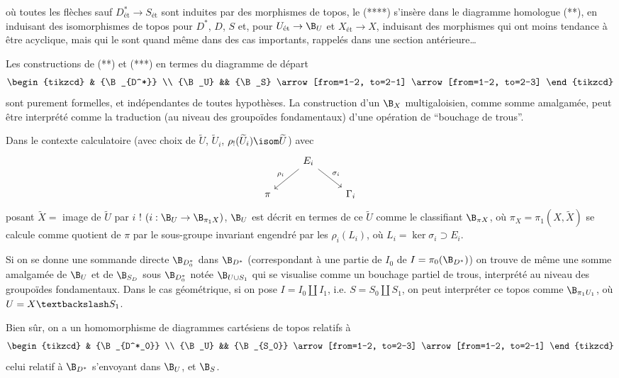 où toutes les flèches sauf $D^*_{\text{ét}} \to S_{\text{ét}}$ sont induites par des morphismes de topos, le (****) s'insère dans le diagramme homologue (**), en induisant des isomorphismes de topos pour $D^*$, $D$, $S$ et, pour $U_{\text{ét}} \to \B_U$ et $X_{\text{ét}} \to X$, induisant des morphismes qui ont moins tendance à être acyclique, mais qui le sont quand même dans des cas importants, rappelés dans une section antérieure\dots

Les constructions de (**) et (***) en termes du diagramme de départ
\[\begin{tikzcd}
	& {\B_{D^*}} \\
	{\B_U} && {\B_S}
	\arrow[from=1-2, to=2-1]
	\arrow[from=1-2, to=2-3]
\end{tikzcd}\]
sont purement formelles, et indépendantes de toutes hypothèses. La construction d'un $\B_X$ multigaloisien, comme somme amalgamée, peut être interprété comme la traduction (au niveau des groupoïdes fondamentaux) d'une opération de ``bouchage de trous''.

Dans le contexte calculatoire (avec choix de $\widetilde{U}$, $\widetilde{U}_i$, $\rho_! (\widetilde{U}_i) \isom \widetilde{U}$) avec
\[\begin{tikzcd}
	& {E_i} \\
	\pi && {\Gamma_i}
	\arrow["{\rho_i}"', from=1-2, to=2-1]
	\arrow["{\sigma_i}", from=1-2, to=2-3]
\end{tikzcd}\]
posant $\widetilde{X} =$ image de $\widetilde{U}$ par $i$ ! $(i: \B_U \to \B_{\pi_1 X})$, $\B_U$ est décrit en termes de ce $\widetilde{U}$ comme le classifiant $\B_{\pi X}$, où $\pi_X = \pi_1 (X, \widetilde{X})$ se calcule comme quotient de $\pi$ par le sous-groupe invariant engendré par les $\rho_i (L_i)$, où $L_i = \ker \sigma_i \supset E_i$.

Si on se donne une sommande directe $\B_{D^*_0}$ dans $\B_{D^*}$ (correspondant à une partie de $I_0$ de $I = \pi_0 (\B_{D^*})$) on trouve de même une somme amalgamée de $\B_U$ et de $\B_{S_D}$ sous $\B_{D^*_0}$ notée $\B_{U \cup S_1}$ qui se visualise comme un bouchage partiel de trous, interprété au niveau des groupoïdes fondamentaux. Dans le cas géométrique, si on pose $I = I_0 \amalg I_1$, i.e. $S = S_0 \amalg S_1$, on peut interpréter ce topos comme $\B_{\pi_1 U_1}$, où $U = X \textbackslash S_1$. 

Bien sûr, on a un homomorphisme de diagrammes cartésiens de topos relatifs à 
\[\begin{tikzcd}
	& {\B_{D^*_0}} \\
	{\B_U} && {\B_{S_0}}
	\arrow[from=1-2, to=2-3]
	\arrow[from=1-2, to=2-1]
\end{tikzcd}\]
celui relatif à $\B_{D^*}$ s'envoyant dans $\B_U$, et $\B_S$.

